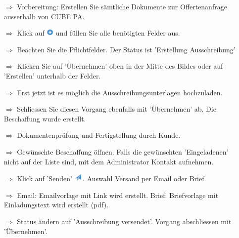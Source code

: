 \documentclass{article}
\begin{document}
\begin{multicols}{2}

\begin{tcolorbox}[colback=blue!5,colframe=blue!40!black,title=(1) Neue Beschaffung initialisieren]
\begin{itemize}
  \item[$\Longrightarrow$] Vorbereitung: Erstellen Sie sämtliche Dokumente zur Offertenanfrage ausserhalb von CUBE PA.
  \item[$\Longrightarrow$] Klick auf \includegraphics[height=10pt]{Icons/Plussymbol.jpg} und füllen Sie alle benötigten Felder aus.
  \item[$\Longrightarrow$] Beachten Sie die Pflichtfelder. Der Status ist 'Erstellung Ausschreibung'
  \item[$\Longrightarrow$] Klicken Sie auf 'Übernehmen' oben in der Mitte des Bildes oder auf 'Erstellen' unterhalb der Felder.
	\item[$\Longrightarrow$] Erst jetzt ist es möglich die Ausschreibungsunterlagen hochzuladen.
  \item[$\Longrightarrow$] Schliessen Sie diesen Vorgang ebenfalls mit 'Übernehmen' ab. Die Beschaffung wurde erstellt.
	\item[$\Longrightarrow$] Dokumentenprüfung und Fertigstellung durch Kunde.
\end{itemize}
\end{tcolorbox}


\begin{tcolorbox}[colback=blue!5,colframe=blue!40!black,title=(2) Offertanfrage versenden]
\begin{itemize}
  \item[$\Longrightarrow$] Gewünschte Beschaffung öffnen. Falls die gewünschten 'Eingeladenen' nicht auf der Liste sind, mit dem Administrator Kontakt aufnehmen.
	\item[$\Longrightarrow$] Klick auf 'Senden' \includegraphics[height=12pt]{Icons/Versandsymbol.jpg}. Auswahl Versand per Email oder Brief.
  \item[$\Longrightarrow$] Email: Emailvorlage mit Link wird erstellt. Brief: Briefvorlage mit Einladungstext wird erstellt (pdf).
  \item[$\Longrightarrow$] Status ändern auf 'Ausschreibung versendet'. Vorgang abschliessen mit 'Übernehmen'.
\end{itemize}
\end{tcolorbox}


\end{multicols}
\end{document}
